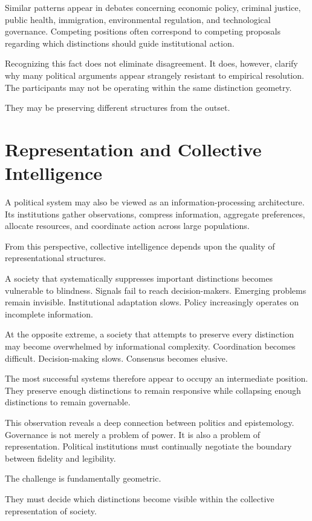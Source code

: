 \documentclass[11pt,oneside,openany]{book}
\begin{document}
Similar patterns appear in debates concerning economic policy, criminal justice, public health, immigration, environmental regulation, and technological governance. Competing positions often correspond to competing proposals regarding which distinctions should guide institutional action.

Recognizing this fact does not eliminate disagreement. It does, however, clarify why many political arguments appear strangely resistant to empirical resolution. The participants may not be operating within the same distinction geometry.

They may be preserving different structures from the outset.

\section{Representation and Collective Intelligence}

A political system may also be viewed as an information-processing architecture. Its institutions gather observations, compress information, aggregate preferences, allocate resources, and coordinate action across large populations.

From this perspective, collective intelligence depends upon the quality of representational structures.

A society that systematically suppresses important distinctions becomes vulnerable to blindness. Signals fail to reach decision-makers. Emerging problems remain invisible. Institutional adaptation slows. Policy increasingly operates on incomplete information.

At the opposite extreme, a society that attempts to preserve every distinction may become overwhelmed by informational complexity. Coordination becomes difficult. Decision-making slows. Consensus becomes elusive.

The most successful systems therefore appear to occupy an intermediate position. They preserve enough distinctions to remain responsive while collapsing enough distinctions to remain governable.

This observation reveals a deep connection between politics and epistemology. Governance is not merely a problem of power. It is also a problem of representation. Political institutions must continually negotiate the boundary between fidelity and legibility.

The challenge is fundamentally geometric.

They must decide which distinctions become visible within the collective representation of society.
\end{document}
